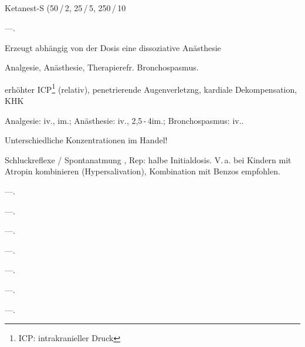 \subsection{}



{
\begin{MedikamentCharakteristika}
  \item[{\TxItemSpezialitaeten}]  Ketanest-S{\texttrademark} 
  (50\Mg\,/\,2\Ml, 
  25\Mg\,/\,5\Ml,
  250\Mg\,/\,10\Ml
  \item[{\TxItemBeschreibung}] ---.
  \item[{\TxItemWirkung}] Erzeugt abhängig von der Dosis eine 
  dissoziative Anästhesie
  \item[{\TxItemIndikation}] Analgesie, Anästhesie, Therapierefr. 
  Bronchospasmus.
  \item[{\TxItemKontraindikation}] 
  erhöhter ICP\footnote{ICP: intrakranieller Druck} (relativ),
  penetrierende Augenverletzng, 
  kardiale Dekompensation, KHK
  \item[\TxItemDosierung]
  Analgesie: \MgKg* iv.,
  \MgKg* im.; 
  Anästhesie: \MgKg* iv., 2,5\,-\,4\MgKg* 
  im.;
  Bronchospasmus: \MgKg* iv..
  \item[{\TxItemCave}] Unterschiedliche Konzentrationen im 
  Handel! 
  \item[Anm] Schluckreflexe / Spontanatmung , Rep: halbe 
  Initialdosis.
  V.\,a. bei Kindern mit Atropin kombinieren (Hypersalivation), 
  Kombination mit Benzos empfohlen.
\end{MedikamentCharakteristika}}
{}



\begin{MedikamentCharakteristika}
  \item[{\TxItemSpezialitaeten}] ---.
  \item[Beschreibung] ---.
  \item[{\TxItemIndikation}] ---.
  \item[{\TxItemKontraindikation}] ---.
  \item[{\TxItemDosierung}] ---.
  \item[{\TxItemCave}] ---.
  \item[Anm] ---.
\end{MedikamentCharakteristika}




